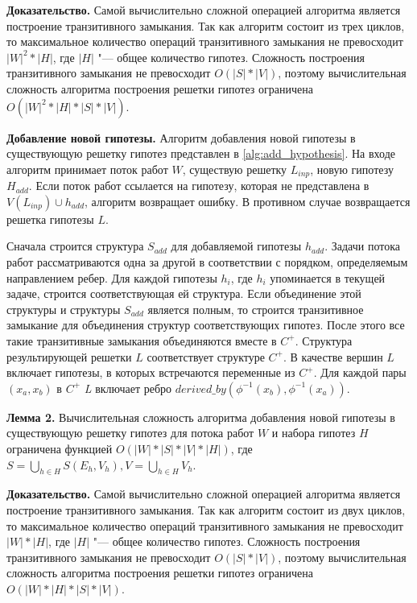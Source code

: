 \textbf{Доказательство.} Самой вычислительно сложной операцией алгоритма является построение транзитивного замыкания. 
Так как алгоритм состоит из трех циклов, то максимальное количество операций транзитивного замыкания не превосходит 
$|W|^2*|H|$, где $|H|$ "--- общее количество гипотез. Сложность построения транзитивного замыкания не превосходит 
$O\left(|S|*|V|\right)$, поэтому вычислительная сложность алгоритма построения решетки гипотез ограничена 
$O\left(|W|^2*|H|*|S|*|V|\right)$.

\textbf{Добавление новой гипотезы.} Алгоритм добавления новой гипотезы в существующую решетку гипотез представлен 
в \cref{alg:add_hypothesis}. На входе алгоритм принимает поток работ $W$, существую решетку $L_{inp}$, новую гипотезу 
$H_{add}$. Если поток работ ссылается на гипотезу, которая не представлена в $V\left(L_{inp}\right) \cup h_{add}$, 
алгоритм возвращает ошибку. В противном случае возвращается решетка гипотезы $L$.  

Сначала строится структура $S_{add}$ для добавляемой гипотезы $h_{add}$. Задачи потока работ рассматриваются одна 
за другой в соответствии с порядком, определяемым направлением ребер. Для каждой гипотезы $h_i$, где $h_i$ упоминается 
в текущей задаче, строится соответствующая ей структура. Если объединение этой структуры и структуры $S_{add}$ является 
полным, то строится транзитивное замыкание для объединения структур соответствующих гипотез. После этого все такие 
транзитивные замыкания объединяются вместе в $C^+$. Структура результирующей решетки $L$ соответствует структуре $C^+$. 
В качестве вершин $L$ включает гипотезы, в которых встречаются переменные из $C^+$. Для каждой пары 
$\left(x_a, x_b\right)$ в $C^+$ \textit{L} включает ребро 
$derived\_by \left(\phi^{-1}\left(x_b\right), \phi^{-1}\left(x_a\right)\right)$.

\textbf{Лемма 2.} Вычислительная сложность алгоритма добавления новой гипотезы в существующую решетку гипотез для 
потока работ $W$ и набора гипотез $H$ ограничена функцией $ O\left( |W| * |S| * |V| * |H| \right)$, 
где $S = \bigcup\limits_{h \in H} S\left(E_h, V_h \right), V = \bigcup\limits_{h \in H} V_h$.

\textbf{Доказательство.} Самой вычислительно сложной операцией алгоритма является построение транзитивного замыкания. 
Так как алгоритм состоит из двух циклов, то максимальное количество операций транзитивного замыкания не превосходит 
$|W|*|H|$, где $|H|$ "--- общее количество гипотез. Сложность построения транзитивного замыкания не превосходит 
$O\left(|S|*|V|\right)$, поэтому вычислительная сложность алгоритма построения решетки гипотез ограничена 
$O\left(|W|*|H|*|S|*|V|\right)$.


